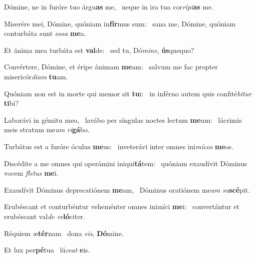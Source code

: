\item Dómine, ne in furóre tuo árgu\textbf{as} me,~\psstar{} neque in ira tua cor\textit{rípi}\textbf{as} me.
\item Miserére mei, Dómine, quóniam in\textbf{fír}mus sum:~\psstar{} sana me, Dómine, quóniam conturbáta sunt \textit{ossa} \textbf{me}a.
\item Et ánima mea turbáta est \textbf{val}de:~\psstar{} sed tu, Dó\textit{mine}, \textbf{ús}quequo?
\item Convértere, Dómine, et éripe ánimam \textbf{me}am:~\psstar{} salvum me fac propter misericór\textit{diam} \textbf{tu}am.
\item Quóniam non est in morte qui memor sit \textbf{tu}i:~\psstar{} in inférno autem quis confité\textit{bitur} \textbf{ti}bi?
\item Laborávi in gémitu meo,~\pscross{} la\-vábo per síngulas noctes lectum \textbf{me}um:~\psstar{} lácrimis meis stratum me\textit{um} \textit{ri}\textbf{gá}bo.
\item Turbátus est a furóre óculus \textbf{me}us:~\psstar{} inveterávi inter omnes ini\textit{mícos} \textbf{me}os.
\item Discédite a me omnes qui operámini iniqui\textbf{tá}tem:~\psstar{} quóniam exaudívit Dóminus vocem \textit{fletus} \textbf{me}i.
\item Exaudívit Dóminus deprecatiónem \textbf{me}am,~\psstar{} Dóminus oratiónem me\textit{am} \textit{su}\textbf{scé}pit.
\item Erubéscant et conturbéntur veheménter omnes inimíci \textbf{me}i:~\psstar{} convertántur et erubéscant val\textit{de} \textit{ve}\textbf{ló}citer.
\item Réquiem æ\textbf{tér}nam~\psstar{} dona \textit{eis}, \textbf{Dó}mine.
\item Et lux per\textbf{pé}tua~\psstar{} lú\textit{ceat} \textbf{e}is.

